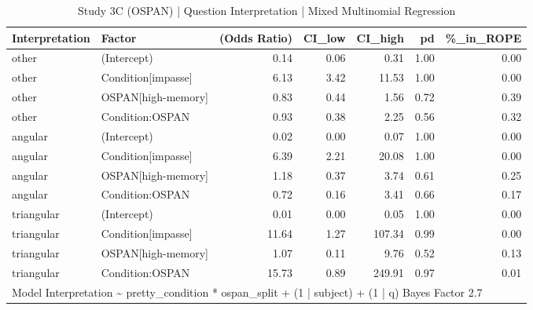 \begin{table}

\caption{Study 3C (OSPAN) | Question Interpretation | Mixed Multinomial Regression}
\centering
\begin{tabular}[t]{l|l|r|r|r|r|r}
\hline
Interpretation & Factor & (Odds Ratio) & CI\_low & CI\_high & pd & \%\_in\_ROPE\\
\hline
other & (Intercept) & 0.14 & 0.06 & 0.31 & 1.00 & 0.00\\
\hline
other & Condition[impasse] & 6.13 & 3.42 & 11.53 & 1.00 & 0.00\\
\hline
other & OSPAN[high-memory] & 0.83 & 0.44 & 1.56 & 0.72 & 0.39\\
\hline
other & Condition:OSPAN & 0.93 & 0.38 & 2.25 & 0.56 & 0.32\\
\hline
angular & (Intercept) & 0.02 & 0.00 & 0.07 & 1.00 & 0.00\\
\hline
angular & Condition[impasse] & 6.39 & 2.21 & 20.08 & 1.00 & 0.00\\
\hline
angular & OSPAN[high-memory] & 1.18 & 0.37 & 3.74 & 0.61 & 0.25\\
\hline
angular & Condition:OSPAN & 0.72 & 0.16 & 3.41 & 0.66 & 0.17\\
\hline
triangular & (Intercept) & 0.01 & 0.00 & 0.05 & 1.00 & 0.00\\
\hline
triangular & Condition[impasse] & 11.64 & 1.27 & 107.34 & 0.99 & 0.00\\
\hline
triangular & OSPAN[high-memory] & 1.07 & 0.11 & 9.76 & 0.52 & 0.13\\
\hline
triangular & Condition:OSPAN & 15.73 & 0.89 & 249.91 & 0.97 & 0.01\\
\hline
\multicolumn{7}{l}{\rule{0pt}{1em}Model Interpretation \textasciitilde{}  pretty\_condition * ospan\_split + (1 | subject) + (1 | q) Bayes Factor  2.7}\\
\end{tabular}
\end{table}
